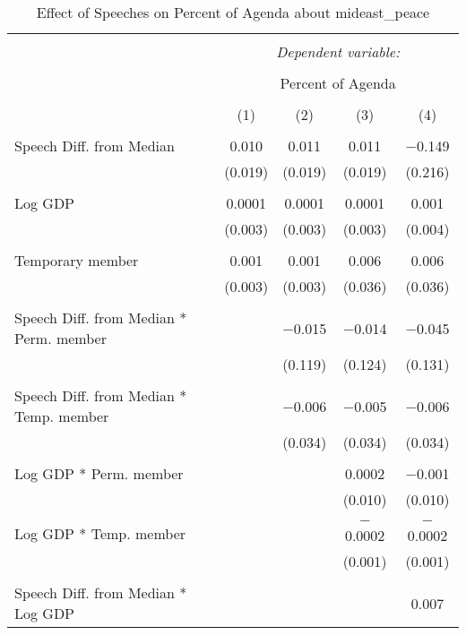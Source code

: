 
\begin{table}[!htbp] \centering 
  \caption{Effect of Speeches on Percent of Agenda about mideast_peace} 
  \label{} 
\begin{tabular}{@{\extracolsep{5pt}}lcccc} 
\\[-1.8ex]\hline 
\hline \\[-1.8ex] 
 & \multicolumn{4}{c}{\textit{Dependent variable:}} \\ 
\cline{2-5} 
\\[-1.8ex] & \multicolumn{4}{c}{Percent of Agenda} \\ 
\\[-1.8ex] & (1) & (2) & (3) & (4)\\ 
\hline \\[-1.8ex] 
 Speech Diff. from Median & 0.010 & 0.011 & 0.011 & $-$0.149 \\ 
  & (0.019) & (0.019) & (0.019) & (0.216) \\ 
  & & & & \\ 
 Log GDP & 0.0001 & 0.0001 & 0.0001 & 0.001 \\ 
  & (0.003) & (0.003) & (0.003) & (0.004) \\ 
  & & & & \\ 
 Temporary member & 0.001 & 0.001 & 0.006 & 0.006 \\ 
  & (0.003) & (0.003) & (0.036) & (0.036) \\ 
  & & & & \\ 
 Speech Diff. from Median * Perm. member &  & $-$0.015 & $-$0.014 & $-$0.045 \\ 
  &  & (0.119) & (0.124) & (0.131) \\ 
  & & & & \\ 
 Speech Diff. from Median * Temp. member &  & $-$0.006 & $-$0.005 & $-$0.006 \\ 
  &  & (0.034) & (0.034) & (0.034) \\ 
  & & & & \\ 
 Log GDP * Perm. member &  &  & 0.0002 & $-$0.001 \\ 
  &  &  & (0.010) & (0.010) \\ 
  & & & & \\ 
 Log GDP * Temp. member &  &  & $-$0.0002 & $-$0.0002 \\ 
  &  &  & (0.001) & (0.001) \\ 
  & & & & \\ 
 Speech Diff. from Median * Log GDP &  &  &  & 0.007 \\ 

\end{tabular}
\end{table}

